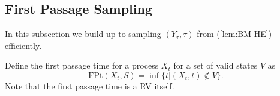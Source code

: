 \documentclass[a4paper,12pt]{article}
\begin{document}

\subsection{First Passage Sampling}
In this subsection we build up to sampling $(Y_{\tau},\tau)$ from (\ref{lem:BM HE}) efficiently.

\begin{definition} \label{def:first passage time}
    Define the first passage time for a process $X_{t}$ for a set of valid states
    $V$ as
    \begin{equation}
        \text{FPt}(X_{t},S)=\inf \{t| (X_{t},t) \notin V \}
        .
    \end{equation}
    Note that the first passage time is a RV itself.
\end{definition}
\end{document}
